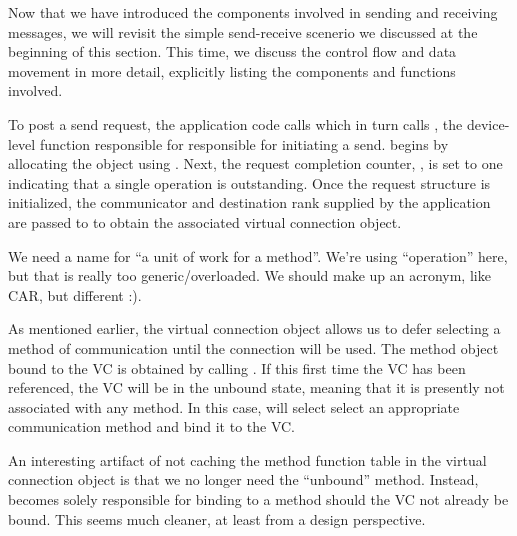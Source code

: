 
Now that we have introduced the components involved in sending and receiving
messages, we will revisit the simple send-receive scenerio we discussed at the
beginning of this section.  This time, we discuss the control flow and data
movement in more detail, explicitly listing the components and functions
involved.


To post a send request, the application code calls  which in
turn calls , the device-level function responsible for
responsible for initiating a send.   begins by allocating the
 object using .  Next, the
request completion counter, , is set to one indicating
that a single operation is outstanding.  Once the request structure is
initialized, the communicator and destination rank supplied by the application
are passed to  to obtain the associated virtual
connection object.

\begin{cmt}
  We need a name for ``a unit of work for a method''.  We're using
  ``operation'' here, but that is really too generic/overloaded.  We should
  make up an acronym, like CAR, but different :).
\end{cmt}

As mentioned earlier, the virtual connection object allows us to defer
selecting a method of communication until the connection will be used.  The
method object bound to the VC is obtained by calling
.  If this first time the VC has been referenced,
the VC will be in the unbound state, meaning that it is presently not
associated with any method.  In this case,  will
select select an appropriate communication method and bind it to the VC.

\begin{cmt}
  An interesting artifact of not caching the method function table in the
  virtual connection object is that we no longer need the ``unbound'' method.
  Instead,  becomes solely responsible for binding to
  a method should the VC not already be bound.  This seems much cleaner, at
  least from a design perspective.
\end{cmt}

